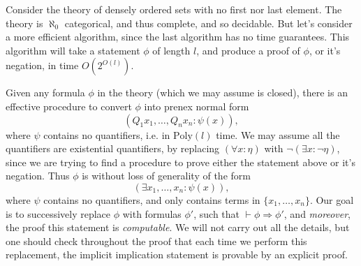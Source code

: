 \begin{example}
    Consider the theory of densely ordered sets with no first nor last element. The theory is $\aleph_0$ categorical, and thus complete, and so decidable. But let's consider a more efficient algorithm, since the last algorithm has no time guarantees. This algorithm will take a statement $\phi$ of length $l$, and produce a proof of $\phi$, or it's negation, in time $O(2^{O(l)})$.

    Given any formula $\phi$ in the theory (which we may assume is closed), there is an effective procedure to convert $\phi$ into prenex normal form
    \[ (Q_1 x_1, \dots, Q_n x_n: \psi(x)), \]
    where $\psi$ contains no quantifiers, i.e. in $\text{Poly}(l)$ time. We may assume all the quantifiers are existential quantifiers, by replacing $(\forall x: \eta)$ with $\neg (\exists x: \neg \eta)$, since we are trying to find a procedure to prove either the statement above or it's negation. Thus $\phi$ is without loss of generality of the form
    \[ (\exists x_1, \dots, x_n : \psi(x)), \]
    where $\psi$ contains no quantifiers, and only contains terms in $\{ x_1, \dots, x_n \}$. Our goal is to successively replace $\phi$ with formulas $\phi'$, such that $\vdash \phi \Rightarrow \phi'$, and \emph{moreover}, the proof this statement is \emph{computable}. We will not carry out all the details, but one should check throughout the proof that each time we perform this replacement, the implicit implication statement is provable by an explicit proof.


\end{example}
